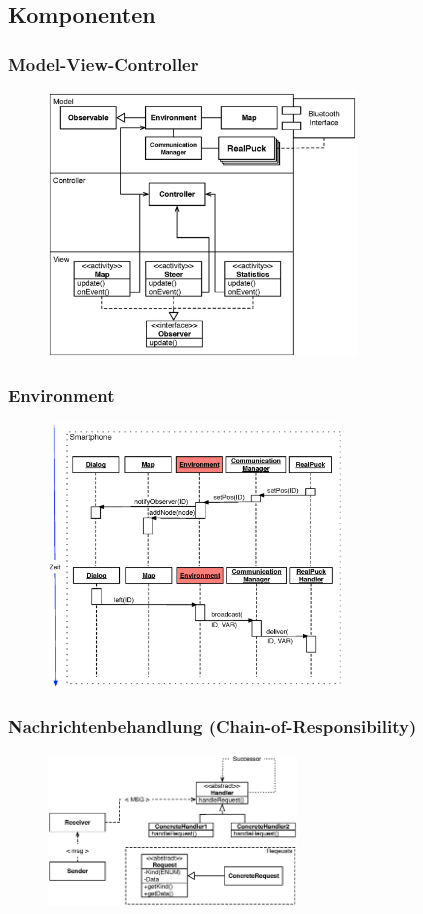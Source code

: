 \documentclass[xcolor=dvipsnames]{beamer}
\begin{document}
	\subsection{Komponenten}
		\begin{frame}
			\frametitle{Model-View-Controller}
			\begin{figure}[htbp]
				\centering
				\includegraphics[height=7cm]{images/android_mvc.eps}
  			\end{figure}		
		\end{frame}	
		\begin{frame}
			\frametitle{Environment}
			\begin{figure}[htbp]
				\centering
					\includegraphics[height=7cm]{images/sequenzdiagramm_environment.eps}
  			\end{figure}		
		\end{frame}	
		\begin{frame}
			\frametitle{Nachrichtenbehandlung (Chain-of-Responsibility)}
			\begin{figure}[htbp]
				\centering
					\includegraphics[height=4cm]{images/android_handler.eps}
  			\end{figure}		
		\end{frame}	
\end{document}
